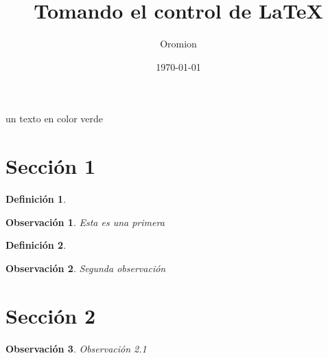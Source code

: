 \documentclass{article}
\title{Tomando el control de \LaTeX{}}
\author{Oromion}
\date{\today}
\newtheorem{definicion}{Definición}
\newtheorem{obs}{Observación}[section]
\begin{document}
\maketitle

\textcolor{myGreen}{un texto en color verde}

\lipsum[1]

\cuadratica{}

\lipsum[1]

\cuadratica{}

\Fourier[eq]


\section{Sección 1}

\lipsum[1]
\begin{definicion}
\lipsum[1]
\end{definicion}

\begin{obs}
Esta es una primera
\end{obs}

\begin{definicion}
	\lipsum[1]
\end{definicion}


\begin{obs}
Segunda observación

\end{obs}

\section{Sección 2}

\begin{obs}
Observación 2.1
\end{obs}
\end{document}
